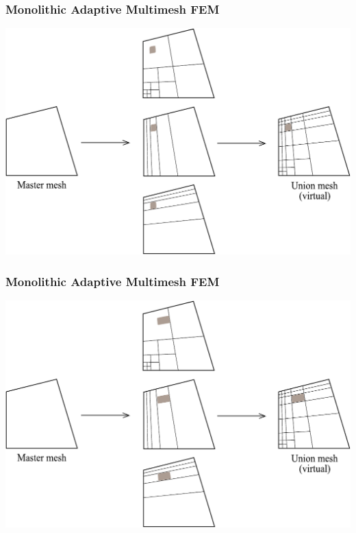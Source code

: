 \begin{frame}
  \frametitle{Monolithic Adaptive Multimesh FEM}
  \begin{center}
    \includegraphics[height=0.7\textheight]{multimesh/mm_22.pdf}
  \end{center}
\end{frame}

\begin{frame}
  \frametitle{Monolithic Adaptive Multimesh FEM}
  \begin{center}
    \includegraphics[height=0.7\textheight]{multimesh/mm_23.pdf}
  \end{center}
\end{frame}

